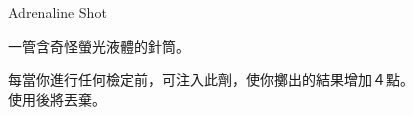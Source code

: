 
\begin{ItemCard}{Adrenaline Shot}

  \begin{CardStory}
    一管含奇怪螢光液體的針筒。
  \end{CardStory}

  每當你進行任何檢定前，可注入此劑，使你擲出的結果增加４點。 \\[.5em]
  使用後將\ThisName{}丟棄。 \\[.5em]

\end{ItemCard}
